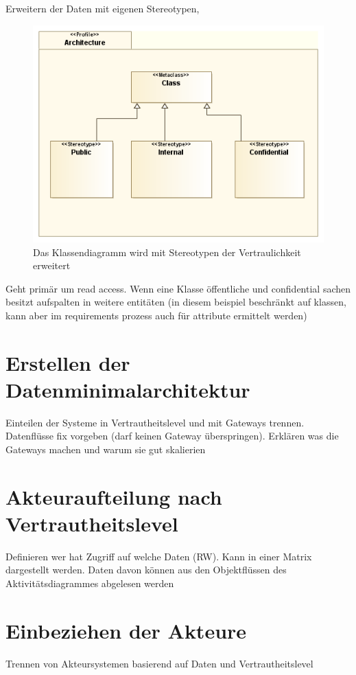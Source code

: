 Erweitern der Daten mit eigenen Stereotypen,

\begin{figure}[!htbp]
    \centering
    \includegraphics[scale=0.5]{uml/datastereotypes.png}
    \caption{Das Klassendiagramm wird mit Stereotypen der Vertraulichkeit erweitert}
\end{figure}


Geht primär um read access. Wenn eine Klasse öffentliche und confidential sachen besitzt aufspalten in weitere entitäten (in diesem beispiel beschränkt auf klassen, kann aber im requirements prozess auch für attribute ermittelt werden)

\section{Erstellen der Datenminimalarchitektur}
Einteilen der Systeme in Vertrautheitslevel und mit Gateways trennen. Datenflüsse fix vorgeben (darf keinen Gateway überspringen). Erklären was die Gateways machen und warum sie gut skalierien


\section{Akteuraufteilung nach Vertrautheitslevel}
Definieren wer hat Zugriff auf welche Daten (RW). Kann in einer Matrix dargestellt werden. Daten davon können aus den Objektflüssen des Aktivitätsdiagrammes abgelesen werden


\section{Einbeziehen der Akteure}
Trennen von Akteursystemen basierend auf Daten und Vertrautheitslevel

